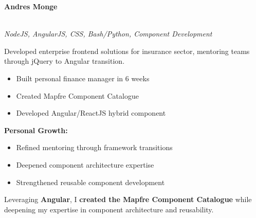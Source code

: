 \documentclass[a4paper,10pt]{article}
\begin{document}
    \noindent
    \begin{minipage}{\textwidth}
        \hfill
        {\large\bfseries\color{blue}\selectfont
        A\color{lightblue}ndr\color{blue}e\color{lightblue}s \color{blue}Monge}
        \vspace{0.3cm}

    \noindent\uline{} \\
    \vspace{0.1cm} \hspace{0.2cm}
	{\small\textit{NodeJS, AngularJS, CSS, Bash/Python, Component Development}}

	Developed enterprise frontend solutions for insurance sector, mentoring teams through jQuery to Angular transition.

	\vspace{0.2cm}
	\begin{itemize}[label=\textcolor{darkblue}{\textbullet}, leftmargin=*, nosep]
		\item Built personal finance manager in 6 weeks
		\item Created Mapfre Component Catalogue
		\item Developed Angular/ReactJS hybrid component
	\end{itemize}

	\vspace{0.2cm}
	\textbf{Personal Growth:}
	\vspace{0.2cm}
	\begin{itemize}[label=\textcolor{darkblue}{\textbullet}, leftmargin=*, nosep]
		\item Refined mentoring through framework transitions
		\item Deepened component architecture expertise
		\item Strengthened reusable component development
	\end{itemize}

    \vspace{0.2cm}

    Leveraging \textbf{Angular}, I \textbf{created the Mapfre Component Catalogue} while deepening my expertise in component architecture and reusability.


\end{minipage}
\end{document}
